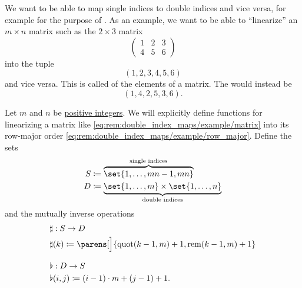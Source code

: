\begin{remark}\label{rem:double_index_maps}
  We want to be able to map single indices to double indices and vice versa, for example for the purpose of . As an example, we want to be able to \enquote{linearize} an \( m \times n \) matrix such as the \( 2 \times 3 \) matrix
  \begin{equation}\label{eq:rem:double_index_maps/example/matrix}
    \begin{pmatrix}
      1 & 2 & 3 \\
      4 & 5 & 6
    \end{pmatrix}
  \end{equation}
  into the tuple
  \begin{equation}\label{eq:rem:double_index_maps/example/row_major}
    (1, 2, 3, 4, 5, 6)
  \end{equation}
  and vice versa. This is called  of the elements of a matrix. The  would instead be
  \begin{equation}\label{eq:rem:double_index_maps/example/column_major}
    (1, 4, 2, 5, 3, 6).
  \end{equation}

  Let \( m \) and \( n \) be \hyperref[def:integer_signum]{positive integers}. We will explicitly define functions for linearizing a matrix like \eqref{eq:rem:double_index_maps/example/matrix} into its row-major order \eqref{eq:rem:double_index_maps/example/row_major}. Define the sets
  \begin{align*}
    S &\coloneqq \overbrace{ \set{ 1, \ldots, mn - 1, mn } }^{\T{single indices}}
    \\
    D &\coloneqq \underbrace{ \set{ 1, \ldots, m } \times \set{ 1, \ldots, n } }_{\T{double indices}}
  \end{align*}
  and the mutually inverse operations
  \begin{align}
    &\begin{aligned}\label{eq:rem:double_index_maps/sharp}
      &\sharp: S \to D \\
      &\sharp(k) \coloneqq \parens[\Big]{ \quot(k - 1, m) + 1, \rem(k - 1, m) + 1 } \\
    \end{aligned}
    \\[0.5\baselineskip]
    &\begin{aligned}\label{eq:rem:double_index_maps/flat}
      &\flat: D \to S \\
      &\flat(i, j) \coloneqq (i - 1) \cdot m + (j - 1) + 1.
    \end{aligned}
  \end{align}


\end{remark}
